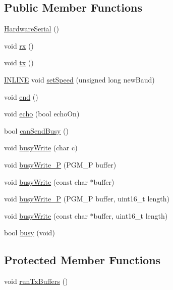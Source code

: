 \subsection*{Public Member Functions}
\begin{DoxyCompactItemize}
\item 
\hyperlink{classmhvlib_1_1_hardware_serial_ab394f939d4ffaf6ac002cc904876004a}{Hardware\-Serial} ()
\item 
void \hyperlink{classmhvlib_1_1_hardware_serial_a4c122e18df598146345c8c9f8d82de5f}{rx} ()
\item 
void \hyperlink{classmhvlib_1_1_hardware_serial_ae2c2856b508c2c2604f6b3b9d2d6887f}{tx} ()
\item 
\hyperlink{io_8h_a2eb6f9e0395b47b8d5e3eeae4fe0c116}{I\-N\-L\-I\-N\-E} void \hyperlink{classmhvlib_1_1_hardware_serial_a513bc3c5f5bb534a2d6166dc92cb1b20}{set\-Speed} (unsigned long new\-Baud)
\item 
void \hyperlink{classmhvlib_1_1_hardware_serial_af8c6bc0b71848c41700c98783cde2b4a}{end} ()
\item 
void \hyperlink{classmhvlib_1_1_hardware_serial_a50b4b931601afd638f85045a6b791c7b}{echo} (bool echo\-On)
\item 
bool \hyperlink{classmhvlib_1_1_hardware_serial_af5ca4e5279bddfe5a6e1abd047316d1b}{can\-Send\-Busy} ()
\item 
void \hyperlink{classmhvlib_1_1_hardware_serial_a5eab32b3c009c8d52d3b12326b15da9f}{busy\-Write} (char c)
\item 
void \hyperlink{classmhvlib_1_1_hardware_serial_a8d05554a0e2e5290c00bdb147f082170}{busy\-Write\-\_\-\-P} (P\-G\-M\-\_\-\-P buffer)
\item 
void \hyperlink{classmhvlib_1_1_hardware_serial_a05de04bdedb34cc76a16f1bba44186bf}{busy\-Write} (const char $\ast$buffer)
\item 
void \hyperlink{classmhvlib_1_1_hardware_serial_a2e5830f92080c1f130a61712bff14c50}{busy\-Write\-\_\-\-P} (P\-G\-M\-\_\-\-P buffer, uint16\-\_\-t length)
\item 
void \hyperlink{classmhvlib_1_1_hardware_serial_a1f48ac4bae620e3bae013963ff1e0344}{busy\-Write} (const char $\ast$buffer, uint16\-\_\-t length)
\item 
bool \hyperlink{classmhvlib_1_1_hardware_serial_a81dc5b3625e24a12988abb8d9879fb89}{busy} (void)
\end{DoxyCompactItemize}
\subsection*{Protected Member Functions}
\begin{DoxyCompactItemize}
\item 
void \hyperlink{classmhvlib_1_1_hardware_serial_a1b412910dd80a178cdb406d2952593e1}{run\-Tx\-Buffers} ()
\end{DoxyCompactItemize}

